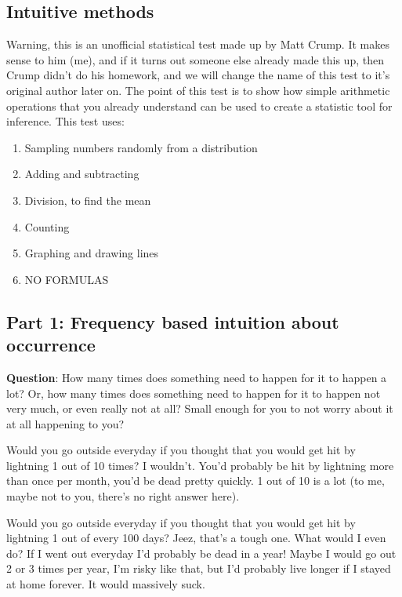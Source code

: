 \documentclass[
  letterpaper,
  DIV=11,
  numbers=noendperiod]{scrreprt}
\providecommand{\tightlist}{%
  \setlength{\itemsep}{0pt}\setlength{\parskip}{0pt}}\usepackage{longtable,booktabs,array}
\begin{document}
\subsection{Intuitive methods}\label{intuitive-methods}

Warning, this is an unofficial statistical test made up by Matt Crump.
It makes sense to him (me), and if it turns out someone else already
made this up, then Crump didn't do his homework, and we will change the
name of this test to it's original author later on. The point of this
test is to show how simple arithmetic operations that you already
understand can be used to create a statistic tool for inference. This
test uses:

\begin{enumerate}
\def\labelenumi{\arabic{enumi}.}
\tightlist
\item
  Sampling numbers randomly from a distribution
\item
  Adding and subtracting
\item
  Division, to find the mean
\item
  Counting
\item
  Graphing and drawing lines
\item
  NO FORMULAS
\end{enumerate}

\subsection{Part 1: Frequency based intuition about
occurrence}\label{part-1-frequency-based-intuition-about-occurrence}

\textbf{Question}: How many times does something need to happen for it
to happen a lot? Or, how many times does something need to happen for it
to happen not very much, or even really not at all? Small enough for you
to not worry about it at all happening to you?

Would you go outside everyday if you thought that you would get hit by
lightning 1 out of 10 times? I wouldn't. You'd probably be hit by
lightning more than once per month, you'd be dead pretty quickly. 1 out
of 10 is a lot (to me, maybe not to you, there's no right answer here).

Would you go outside everyday if you thought that you would get hit by
lightning 1 out of every 100 days? Jeez, that's a tough one. What would
I even do? If I went out everyday I'd probably be dead in a year! Maybe
I would go out 2 or 3 times per year, I'm risky like that, but I'd
probably live longer if I stayed at home forever. It would massively
suck.
\end{document}
